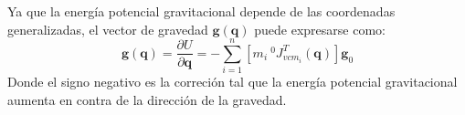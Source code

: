     Ya que la energía potencial gravitacional depende de las coordenadas generalizadas, el vector de gravedad $\boldsymbol{g}(\boldsymbol{q})$ puede
    expresarse como:
    \begin{equation}
        \label{eqn:vector_gravedad}
        \boldsymbol{g}(\boldsymbol{q}) = \frac{\partial U}{\partial \boldsymbol{q}}=-\sum_{i=1}^n \left[m_i \: ^0J_{v{cm_i}}^T(\boldsymbol{q}) \right] \boldsymbol{g}_0
    \end{equation}
    Donde el signo negativo es la correción tal que la energía potencial gravitacional aumenta en contra de la dirección de la gravedad.